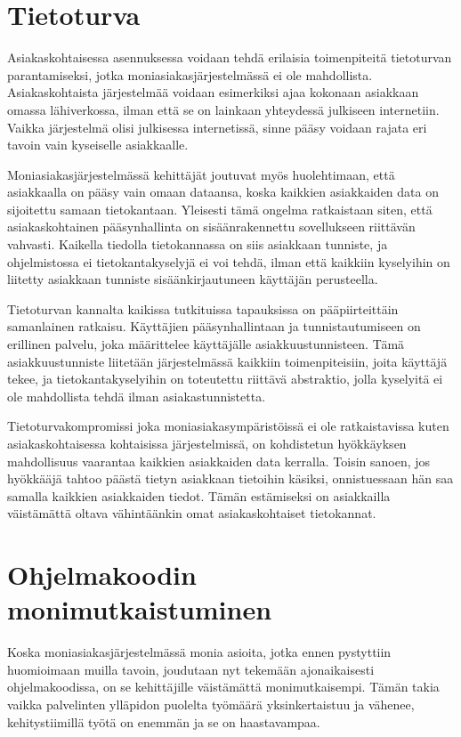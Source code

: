 \section{Tietoturva}
Asiakaskohtaisessa asennuksessa voidaan tehdä erilaisia toimenpiteitä tietoturvan parantamiseksi, jotka moniasiakasjärjestelmässä ei ole mahdollista. Asiakaskohtaista järjestelmää voidaan esimerkiksi ajaa kokonaan asiakkaan omassa lähiverkossa, ilman että se on lainkaan yhteydessä julkiseen internetiin. Vaikka järjestelmä olisi julkisessa internetissä, sinne pääsy voidaan rajata eri tavoin vain kyseiselle asiakkaalle.

Moniasiakasjärjestelmässä kehittäjät joutuvat myös huolehtimaan, että asiakkaalla on pääsy vain omaan dataansa, koska kaikkien asiakkaiden data on sijoitettu samaan tietokantaan. Yleisesti tämä ongelma ratkaistaan siten, että asiakaskohtainen pääsynhallinta on sisäänrakennettu sovellukseen riittävän vahvasti. Kaikella tiedolla tietokannassa on siis asiakkaan tunniste, ja ohjelmistossa ei tietokantakyselyjä ei voi tehdä, ilman että kaikkiin kyselyihin on liitetty asiakkaan tunniste sisäänkirjautuneen käyttäjän perusteella.

Tietoturvan kannalta kaikissa tutkituissa tapauksissa on pääpiirteittäin samanlainen ratkaisu. Käyttäjien pääsynhallintaan ja tunnistautumiseen on erillinen palvelu, joka määrittelee käyttäjälle asiakkuustunnisteen. Tämä asiakkuustunniste liitetään järjestelmässä kaikkiin toimenpiteisiin, joita käyttäjä tekee, ja tietokantakyselyihin on toteutettu riittävä abstraktio, jolla kyselyitä ei ole mahdollista tehdä ilman asiakastunnistetta.

Tietoturvakompromissi joka moniasiakasympäristöissä ei ole ratkaistavissa kuten asiakaskohtaisessa kohtaisissa järjestelmissä, on kohdistetun hyökkäyksen mahdollisuus vaarantaa kaikkien asiakkaiden data kerralla. Toisin sanoen, jos hyökkääjä tahtoo päästä tietyn asiakkaan tietoihin käsiksi, onnistuessaan hän saa samalla kaikkien asiakkaiden tiedot. Tämän estämiseksi on asiakkailla väistämättä oltava vähintäänkin omat asiakaskohtaiset tietokannat.

\section{Ohjelmakoodin monimutkaistuminen}

 Koska moniasiakasjärjestelmässä monia asioita, jotka ennen pystyttiin huomioimaan muilla tavoin, joudutaan nyt tekemään ajonaikaisesti ohjelmakoodissa, on se kehittäjille väistämättä monimutkaisempi. Tämän takia vaikka palvelinten ylläpidon puolelta työmäärä yksinkertaistuu ja vähenee, kehitystiimillä työtä on enemmän ja se on haastavampaa.

